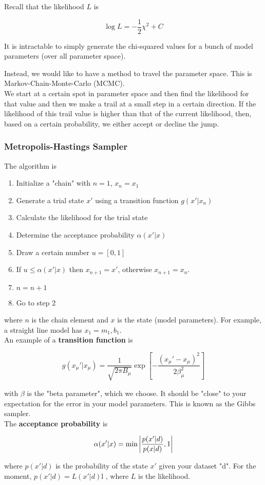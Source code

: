 \documentclass[]{article}
\begin{document}
Recall that the likelihood $L$ is

\[\log L = -\frac{1}{2}\chi^2 + C\]


It is intractable to simply generate the chi-squared values for a bunch of model parameters (over all parameter space). 


Instead, we would like to have a method to travel the parameter space. This is Markov-Chain-Monte-Carlo (MCMC).\\

We start at a certain spot in parameter space and then find the likelihood for that value and then we make a trail at a small step in a certain direction. If the likelihood of this trail value is higher than that of the current likelihood, then, based on a certain probability, we either accept or decline the jump.\\

\subsubsection{Metropolis-Hastings Sampler}\bigbreak

The algorithm is

\begin{enumerate}
	\item Initialize a "chain" with $n=1$, $x_n = x_1$
	\item Generate a trial state $x'$ using a transition function $g(x' | x_n)$
	\item Calculate the likelihood for the trial state
	\item Determine the acceptance probability $\alpha(x'|x)$
	\item Draw a certain number $u = [0, 1]$
	\item If $u \leq \alpha(x'|x)$ then $x_{n+1} = x'$, otherwise $x_{n+1} = x_n$.
	\item $n = n+1$
	\item Go to step 2 
\end{enumerate}\bigbreak

where $n$ is the chain element and $x$ is the state (model parameters). For example, a straight line model has $x_1 = {m_1, b_1}$.\\

An example of a \textbf{transition function} is 

\[g(x_\mu' | x_\mu) = \frac{1}{\sqrt{2\pi B_\mu}}\exp\left[-\frac{(x_\mu' - x_\mu)^2}{2\beta_\mu^2} \right]\]
 
with $\beta$ is the "beta parameter", which we choose. It should be "close" to your expectation for the error in your model parameters. This is known as the Gibbs sampler.\\

The \textbf{acceptance probability} is 

\[\alpha(x'|x) = \min{\abs{\frac{p(x'|d)}{p(x|d)}, 1}}\] 

where $p(x'|d)$ is the probability of the state $x'$ given your dataset "d". For the moment, $p(x'|d) = L(x'|d)$l , where $L$ is the likelihood.\\
\end{document}

